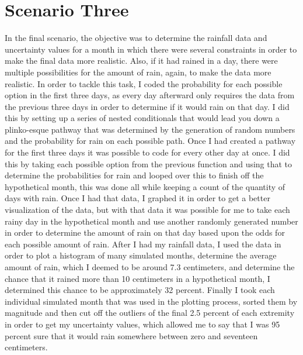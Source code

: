 \documentclass[twocolumn]{revtex4}
\begin{document}
\section{Scenario Three}
In the final scenario, the objective was to determine the rainfall data and uncertainty values for a month in which there were several constraints in order to make the final data more realistic. Also, if it had rained in a day, there were multiple possibilities for the amount of rain, again, to make the data more realistic. In order to tackle this task, I coded the probability for each possible option in the first three days, as every day afterward only requires the data from the previous three days in order to determine if it would rain on that day. I did this by setting up a series of nested conditionals that would lead you down a plinko-esque pathway that was determined by the generation of random numbers and the probability for rain on each possible path. Once I had created a pathway for the first three days it was possible to code for every other day at once. I did this by taking each possible option from the previous function and using that to determine the probabilities for rain and looped over this to finish off the hypothetical month, this was done all while keeping a count of the quantity of days with rain. Once I had that data, I graphed it in order to get a better visualization of the data, but with that data it was possible for me to take each rainy day in the hypothetical month and use another randomly generated number in order to determine the amount of rain on that day based upon the odds for each possible amount of rain. After I had my rainfall data, I used the data in order to plot a histogram of many simulated months, determine the average amount of rain, which I deemed to be around 7.3 centimeters, and determine the chance that it rained more than 10 centimeters in a hypothetical month, I determined this chance to be approximately 32 percent. Finally I took each individual simulated month that was used in the plotting process, sorted them by magnitude and then cut off the outliers of the final 2.5 percent of each extremity in order to get my uncertainty values, which allowed me to say that I was 95 percent sure that it would rain somewhere between zero and seventeen centimeters.
\end{document}
